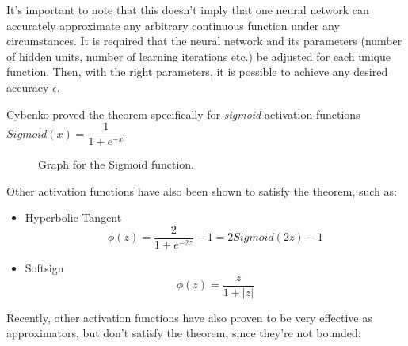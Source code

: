 It's important to note that this doesn't imply that one neural network can accurately approximate any arbitrary continuous function under any circumstances. It is required that the neural network and its parameters (number of hidden units, number of learning iterations etc.) be adjusted for each unique function. Then, with the right parameters, it is possible to achieve any desired accuracy $\epsilon$.

Cybenko proved the theorem specifically for \textit{sigmoid} activation functions $Sigmoid(x)=\dfrac{1}{1+e^{-x}}$
\begin{figure}[H]
\caption{Graph for the Sigmoid function.}
\end{figure}
Other activation functions have also been shown to satisfy the theorem, such as:
\begin{itemize}
    \item Hyperbolic Tangent
    \[
        \phi(z) = \frac{2}{1+e^{-2z}}-1 = 2Sigmoid(2z) - 1    
    \]
    \item Softsign
    \[
        \phi(z) = \frac{z}{1+|z|}
    \]
\end{itemize}
Recently, other activation functions have also proven to be very effective as approximators, but don't satisfy the theorem, since they're not bounded:
